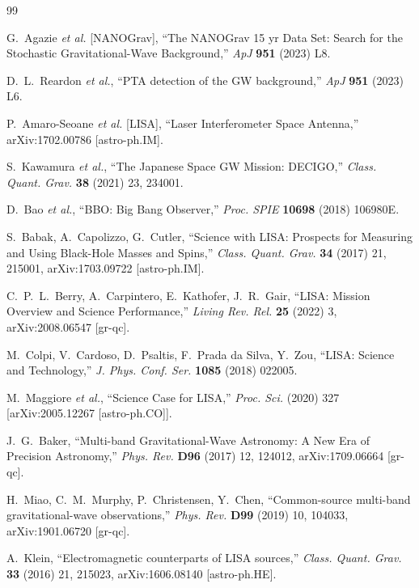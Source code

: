 \documentclass[11pt]{article}
\begin{document}
\begin{thebibliography}{99}

 G.~Agazie \textit{et al.} [NANOGrav], ``The NANOGrav 15 yr Data Set: Search for the Stochastic Gravitational-Wave Background,'' \textit{ApJ} \textbf{951} (2023) L8.

 D.~L.~Reardon \textit{et al.}, ``PTA detection of the GW background,'' \textit{ApJ} \textbf{951} (2023) L6.

 P.~Amaro-Seoane \textit{et al.} [LISA], ``Laser Interferometer Space Antenna,'' arXiv:1702.00786 [astro-ph.IM].

 S.~Kawamura \textit{et al.}, ``The Japanese Space GW Mission: DECIGO,'' \textit{Class. Quant. Grav.} \textbf{38} (2021) 23, 234001.

 D.~Bao \textit{et al.}, ``BBO: Big Bang Observer,'' \textit{Proc. SPIE} \textbf{10698} (2018) 106980E.

 S.~Babak, A.~Capolizzo, G.~Cutler, ``Science with LISA: Prospects for Measuring and Using Black-Hole Masses and Spins,'' \textit{Class. Quant. Grav.} \textbf{34} (2017) 21, 215001, arXiv:1703.09722 [astro-ph.IM].

 C.~P.~L.~Berry, A.~Carpintero, E.~Kathofer, J.~R.~Gair, ``LISA: Mission Overview and Science Performance,'' \textit{Living Rev. Rel.} \textbf{25} (2022) 3, arXiv:2008.06547 [gr-qc].

 M.~Colpi, V.~Cardoso, D.~Psaltis, F.~Prada da Silva, Y.~Zou, ``LISA: Science and Technology,'' \textit{J. Phys. Conf. Ser.} \textbf{1085} (2018) 022005.

 M.~Maggiore \textit{et al.}, ``Science Case for LISA,'' \textit{Proc. Sci.} (2020) 327 [arXiv:2005.12267 [astro-ph.CO]].

 J.~G.~Baker, ``Multi-band Gravitational-Wave Astronomy: A New Era of Precision Astronomy,'' \textit{Phys. Rev.} \textbf{D96} (2017) 12, 124012, arXiv:1709.06664 [gr-qc].

 H.~Miao, C.~M.~Murphy, P.~Christensen, Y.~Chen, ``Common-source multi-band gravitational-wave observations,'' \textit{Phys. Rev.} \textbf{D99} (2019) 10, 104033, arXiv:1901.06720 [gr-qc].

 A.~Klein, ``Electromagnetic counterparts of LISA sources,'' \textit{Class. Quant. Grav.} \textbf{33} (2016) 21, 215023, arXiv:1606.08140 [astro-ph.HE].


\end{thebibliography}
\end{document}
